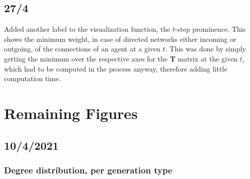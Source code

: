 \documentclass{article}
\begin{document}
\subsection{27/4}

Added another label to the visualization function, the $t$-step prominence. This shows the minimum weight, in case of directed networks either incoming or outgoing, of the connections of an agent at a given $t$. This was done by simply getting the minimum over the respective axes for the \textbf{T} matrix at the given $t$, which had to be computed in the process anyway, therefore adding little computation time.

\newpage

\section{Remaining Figures}

\subsection{10/4/2021}

\subsubsection{Degree distribution, per generation type}
\end{document}
